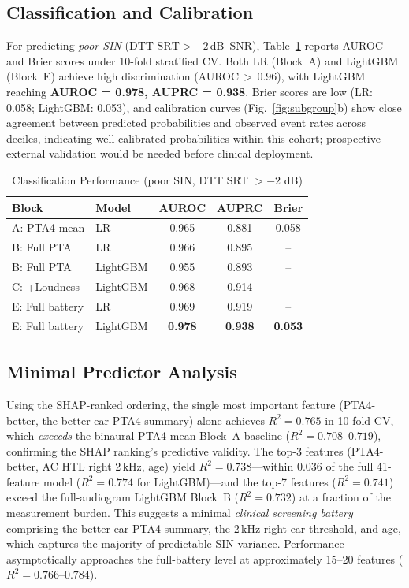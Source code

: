 \documentclass[conference]{IEEEtran}
\begin{document}
\subsection{Classification and Calibration}

For predicting \textit{poor SIN} ($\text{DTT SRT} > -2$\,dB~SNR),
Table~\ref{tab:classification} reports AUROC and Brier scores under 10-fold
stratified CV.  Both LR (Block~A) and LightGBM (Block~E) achieve high
discrimination (AUROC\,$>$\,0.96), with LightGBM reaching \textbf{AUROC =
0.978, AUPRC = 0.938}.  Brier scores are low (LR: 0.058; LightGBM: 0.053),
and calibration curves (Fig.~\ref{fig:subgroup}b) show close agreement
between predicted probabilities and observed event rates across deciles,
indicating well-calibrated probabilities within this cohort; prospective
external validation would be needed before clinical deployment.

\begin{table}[t]
\caption{Classification Performance (poor SIN, DTT SRT $> -2$ dB)}
\label{tab:classification}
\centering
\begin{tabular}{llccc}
\toprule
Block & Model & AUROC & AUPRC & Brier \\
\midrule
A: PTA4 mean & LR   & 0.965 & 0.881 & 0.058 \\
B: Full PTA & LR    & 0.966 & 0.895 & -- \\
B: Full PTA & LightGBM & 0.955 & 0.893 & -- \\
C: +Loudness & LightGBM & 0.968 & 0.914 & -- \\
E: Full battery & LR  & 0.969 & 0.919 & -- \\
E: Full battery & LightGBM & \textbf{0.978} & \textbf{0.938} & \textbf{0.053} \\
\bottomrule
\end{tabular}
\end{table}

\subsection{Minimal Predictor Analysis}

Using the SHAP-ranked ordering, the single most important feature
(PTA4-better, the better-ear PTA4 summary) alone achieves $R^2=0.765$
in 10-fold CV, which \emph{exceeds} the binaural PTA4-mean Block~A baseline
($R^2=0.708$--$0.719$), confirming the SHAP ranking's predictive validity.
The top-3 features (PTA4-better, AC HTL right 2\,kHz, age) yield
$R^2=0.738$---within 0.036 of the full 41-feature model ($R^2=0.774$ for
LightGBM)---and the top-7 features ($R^2=0.741$) exceed the full-audiogram
LightGBM Block~B ($R^2=0.732$) at a fraction of the measurement burden.
This suggests a minimal \textit{clinical screening battery} comprising the
better-ear PTA4 summary, the 2\,kHz right-ear threshold, and age, which
captures the majority of predictable SIN variance.  Performance
asymptotically approaches the full-battery level at approximately 15--20
features ($R^2=0.766$--$0.784$).
\end{document}
